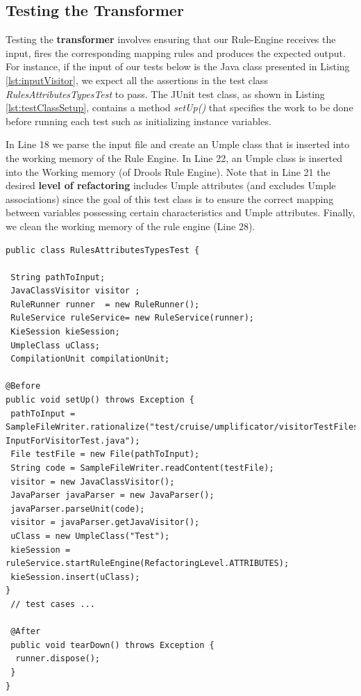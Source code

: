 \subsection{Testing the Transformer}

Testing the \textbf{transformer} involves ensuring that our Rule-Engine receives the input, fires the corresponding mapping rules and produces the expected output.
For instance, if the input of our tests below is the Java class presented in Listing \ref{lst:inputVisitor}, we expect all the assertions in the test class \textit{RulesAttributesTypesTest} to pass. The JUnit test class, as shown in Listing \ref{lst:testClassSetup}, contains a  method \textit{setUp()} that specifies the work to be done before running each test such as initializing instance variables. 

In Line 18 we parse the input file and create an Umple class that is inserted into the working memory of the Rule Engine. In Line 22, an Umple class is inserted into the Working memory (of Drools Rule Engine). Note that in Line 21  the desired \textbf{level of refactoring} includes Umple attributes (and excludes Umple associations) since the goal of this test class is to ensure the correct mapping between variables possessing certain characteristics and Umple attributes. Finally, we clean the working memory of the rule engine (Line 28).

\begin{lstlisting}[style=java, label=lst:testClassSetup, caption=RulesAttributesTypesTest class]
public class RulesAttributesTypesTest {

 String pathToInput;
 JavaClassVisitor visitor ;
 RuleRunner runner  = new RuleRunner();
 RuleService ruleService= new RuleService(runner);
 KieSession kieSession;
 UmpleClass uClass;
 CompilationUnit compilationUnit;
	
@Before
public void setUp() throws Exception {
 pathToInput = SampleFileWriter.rationalize("test/cruise/umplificator/visitorTestFiles/   InputForVisitorTest.java");
 File testFile = new File(pathToInput);
 String code = SampleFileWriter.readContent(testFile);
 visitor = new JavaClassVisitor();
 JavaParser javaParser = new JavaParser();
 javaParser.parseUnit(code);
 visitor = javaParser.getJavaVisitor();
 uClass = new UmpleClass("Test");
 kieSession = ruleService.startRuleEngine(RefactoringLevel.ATTRIBUTES);
 kieSession.insert(uClass);
}
 // test cases ...
 
 @After
 public void tearDown() throws Exception {
  runner.dispose();		
 }
}
\end{lstlisting}

